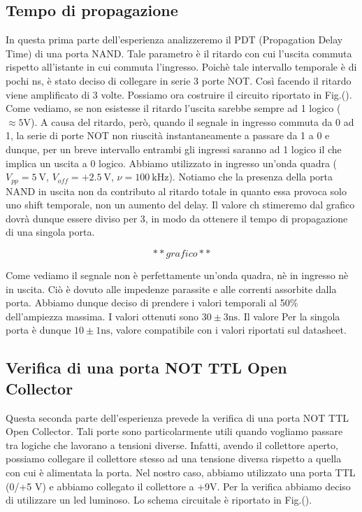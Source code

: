 \subsection{Tempo di propagazione}
In questa prima parte dell'esperienza analizzeremo il PDT (Propagation Delay Time) di una porta NAND. Tale parametro è il ritardo con cui l'uscita commuta rispetto all'istante in cui commuta l'ingresso. Poichè tale intervallo temporale è di pochi \si{\nano\second}, è stato deciso di collegare in serie 3 porte NOT. Così facendo il ritardo viene amplificato di 3 volte. Possiamo ora costruire il circuito riportato in Fig.(). Come vediamo, se non esistesse il ritardo l'uscita sarebbe sempre ad 1 logico ($\approx 5 \si{\volt}$). A causa del ritardo, però, quando il segnale in ingresso commuta da 0 ad 1, la serie di porte NOT non riuscità instantaneamente a passare da 1 a 0 e dunque, per un breve intervallo entrambi gli ingressi saranno ad 1 logico il che implica un uscita a 0 logico. Abbiamo utilizzato in ingresso un'onda quadra ($V_{pp}=\SI{5}{\volt}$, $V_{off}=+\SI{2.5}{\volt}$, $\nu=\SI{100}{\kilo\hertz}$). Notiamo che la presenza della porta NAND in uscita non da contributo al ritardo totale in quanto essa provoca solo uno shift temporale, non un aumento del delay. Il valore ch stimeremo dal grafico dovrà dunque essere diviso per 3, in modo da ottenere il tempo di propagazione di una singola porta. 

$$**grafico**$$ 


Come vediamo il segnale non è perfettamente un'onda quadra, nè in ingresso nè in uscita. Ciò è dovuto alle impedenze parassite e alle correnti assorbite dalla porta. Abbiamo dunque deciso di prendere i valori temporali al 50\% dell'ampiezza massima. I valori ottenuti sono $30\pm 3 \si{\nano\second}$. Il valore Per la singola porta è dunque $10\pm 1 \si{\nano\second}$, valore compatibile con i valori riportati sul datasheet.


\subsection{Verifica di una porta NOT TTL Open Collector }

Questa seconda parte dell'esperienza prevede la verifica di una porta NOT TTL Open Collector. Tali porte sono particolarmente utili quando vogliamo passare tra logiche che lavorano a tensioni diverse. Infatti, avendo il collettore aperto, possiamo collegare il collettore stesso ad una tensione diversa rispetto a quella con cui è alimentata la porta. Nel nostro caso, abbiamo utilizzato una porta TTL (0/+5 \si{\volt}) e abbiamo collegato il collettore a +9\si{\volt}. Per la verifica abbiamo deciso di utilizzare un led luminoso. Lo schema circuitale è riportato in Fig.().

